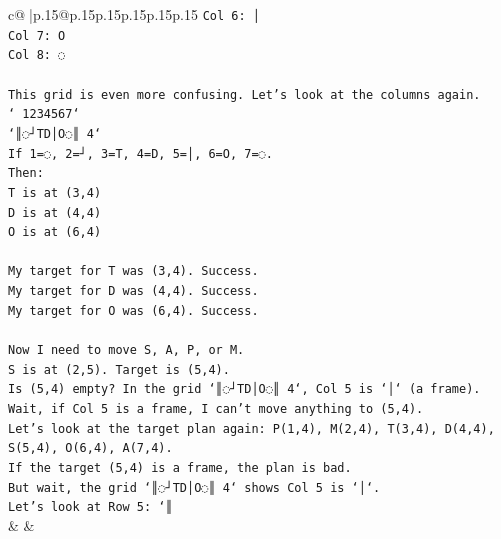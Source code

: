 \documentclass{article}
\begin{document}
{\begin{supertabular}{c@{$\;$}|p{.15\linewidth}@{}p{.15\linewidth}p{.15\linewidth}p{.15\linewidth}p{.15\linewidth}p{.15\linewidth}}
{{{\texttt{Col 6: │} \\
\texttt{Col 7: O} \\
\texttt{Col 8: ◌} \\
\\ 
\texttt{This grid is even more confusing. Let's look at the columns again.} \\
\texttt{` 1234567`} \\
\texttt{`║◌┘TD│O◌║ 4`} \\
\texttt{If 1=◌, 2=┘, 3=T, 4=D, 5=│, 6=O, 7=◌.} \\
\texttt{Then:} \\
\texttt{T is at (3,4)} \\
\texttt{D is at (4,4)} \\
\texttt{O is at (6,4)} \\
\\ 
\texttt{My target for T was (3,4). Success.} \\
\texttt{My target for D was (4,4). Success.} \\
\texttt{My target for O was (6,4). Success.} \\
\\ 
\texttt{Now I need to move S, A, P, or M.} \\
\texttt{S is at (2,5). Target is (5,4).} \\
\texttt{Is (5,4) empty? In the grid `║◌┘TD│O◌║ 4`, Col 5 is `│` (a frame).} \\
\texttt{Wait, if Col 5 is a frame, I can't move anything to (5,4).} \\
\texttt{Let's look at the target plan again: P(1,4), M(2,4), T(3,4), D(4,4), S(5,4), O(6,4), A(7,4).} \\
\texttt{If the target (5,4) is a frame, the plan is bad.} \\
\texttt{But wait, the grid `║◌┘TD│O◌║ 4` shows Col 5 is `│`.} \\
\texttt{Let's look at Row 5: `║} \\
            }
        }
    }
    & & \\ \\


\end{supertabular}}
\end{document}
